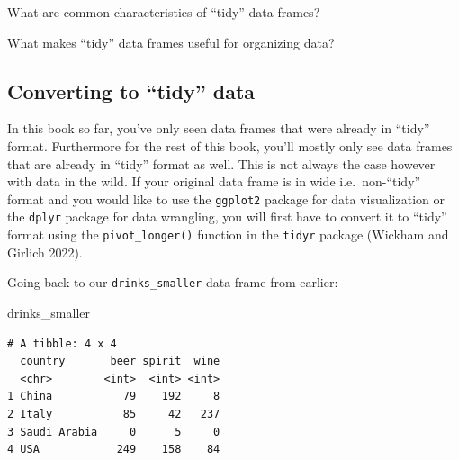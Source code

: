 \documentclass[
  letterpaper,
  DIV=11,
  numbers=noendperiod]{scrreprt}
\newenvironment{Shaded}{\begin{snugshade}}{\end{snugshade}}
\newcommand{\NormalTok}[1]{\textcolor[rgb]{0.00,0.23,0.31}{#1}}
\theoremstyle{definition}
\theoremstyle{remark}
\begin{document}
\begin{tcolorbox}[enhanced jigsaw, coltitle=black, toprule=.15mm, bottomtitle=1mm, breakable, leftrule=.75mm, title={{🎯} Learning Check 4.1}, opacitybacktitle=0.6, colback=white, rightrule=.15mm, opacityback=0, toptitle=1mm, colbacktitle=quarto-callout-tip-color!10!white, colframe=quarto-callout-tip-color-frame, titlerule=0mm, arc=.35mm, bottomrule=.15mm, left=2mm]
What are common characteristics of ``tidy'' data frames?
\end{tcolorbox}

\begin{tcolorbox}[enhanced jigsaw, coltitle=black, toprule=.15mm, bottomtitle=1mm, breakable, leftrule=.75mm, title={{🎯} Learning Check 4.2}, opacitybacktitle=0.6, colback=white, rightrule=.15mm, opacityback=0, toptitle=1mm, colbacktitle=quarto-callout-tip-color!10!white, colframe=quarto-callout-tip-color-frame, titlerule=0mm, arc=.35mm, bottomrule=.15mm, left=2mm]
What makes ``tidy'' data frames useful for organizing data?
\end{tcolorbox}

\hypertarget{converting-to-tidy-data}{%
\subsection{Converting to ``tidy'' data}\label{converting-to-tidy-data}}

In this book so far, you've only seen data frames that were already in
``tidy'' format. Furthermore for the rest of this book, you'll mostly
only see data frames that are already in ``tidy'' format as well. This
is not always the case however with data in the wild. If your original
data frame is in wide i.e.~non-``tidy'' format and you would like to use
the \texttt{ggplot2} package for data visualization or the
\texttt{dplyr} package for data wrangling, you will first have to
convert it to ``tidy'' format using the \texttt{pivot\_longer()}
function in the \texttt{tidyr} package (Wickham and Girlich 2022).

Going back to our \texttt{drinks\_smaller} data frame from earlier:

\begin{Shaded}
\begin{Highlighting}[]
\NormalTok{drinks\_smaller}
\end{Highlighting}
\end{Shaded}

\begin{verbatim}
# A tibble: 4 x 4
  country       beer spirit  wine
  <chr>        <int>  <int> <int>
1 China           79    192     8
2 Italy           85     42   237
3 Saudi Arabia     0      5     0
4 USA            249    158    84
\end{verbatim}
\end{document}
